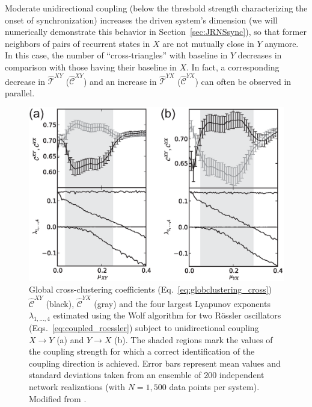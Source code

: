 		Moderate unidirectional coupling (below the threshold strength characterizing the onset of synchronization) increases the driven system's dimension \cite{Romano2007,zou2011} (we will numerically demonstrate this behavior in Section~\ref{sec:JRNSsync}), so that former neighbors of pairs of recurrent states in $X$ are not mutually close in $Y$ anymore. In this case, the number of ``cross-triangles'' with baseline in $Y$ decreases in comparison with those having their baseline in $X$. In fact, a corresponding decrease in $\hat{\mathcal{T}}^{XY}$ ($\hat{\mathcal{C}}^{XY}$) and an increase in $\hat{\mathcal{T}}^{YX}$ ($\hat{\mathcal{C}}^{YX}$) can often be observed in parallel.
\begin{figure}
	\centering
	\includegraphics[scale=0.6]{Chapter03_RecurrenceNt/FUN_XY.eps}
\caption{Global cross-clustering coefficients (Eq.~\ref{eq:globclustering_cross}) $\hat{\mathcal{C}}^{XY}$ (black), $\hat{\mathcal{C}}^{YX}$ (gray) and the four largest Lyapunov exponents $\lambda_{1,\dots,4}$ estimated using the Wolf algorithm \cite{wolf1985} for two R\"ossler oscillators (Eqs.~\ref{eq:coupled_roessler}) subject to unidirectional coupling $X\to Y$ (a) and $Y\to X$ (b). The shaded regions mark the values of the coupling strength for which a correct identification of the coupling direction is achieved. Error bars represent mean values and standard deviations taken from an ensemble of 200 independent network realizations (with $N=1,500$ data points per system). Modified from \cite{Feldhoff2012}. }
\label{fig:roessler_coupling}
\end{figure}

